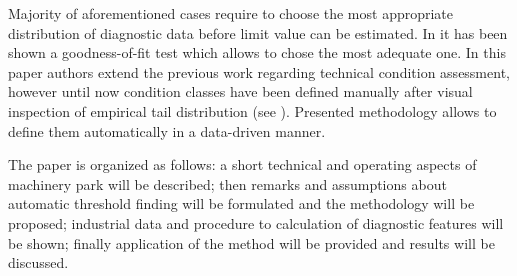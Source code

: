 \documentclass[10pt]{article}
\begin{document}
Majority of aforementioned cases require to choose the most appropriate distribution of diagnostic data before limit value can be estimated. In \cite{jablonski2013modeling} it has been shown a goodness-of-fit test which allows to chose the most adequate one. 
In this paper authors extend the previous work regarding technical condition assessment, however until now condition classes have been defined manually after visual inspection of empirical tail distribution (see \cite{stefaniak2016diagnostic,stefaniak2015procedures}). Presented methodology allows to define them automatically in a data-driven manner.

The paper is organized as follows: a short technical and operating aspects of machinery park will be described; then remarks and assumptions about automatic threshold finding will be formulated and the methodology will be proposed; industrial data and procedure to calculation of diagnostic features will be shown; finally application of the method will be provided and results will be discussed.
\end{document}
